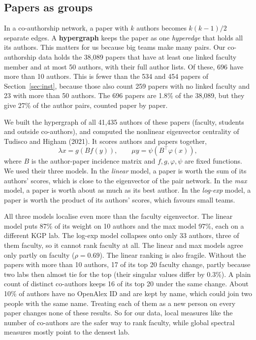 \documentclass[conference,10pt]{IEEEtran}
\begin{document}
\subsection{Papers as groups}
In a co-authorship network, a paper with $k$ authors becomes $k(k-1)/2$ separate edges. A \textbf{hypergraph} keeps the
paper as one \textit{hyperedge} that holds all its authors. This matters for us because big teams make many pairs.
Our co-authorship data holds the 38,089 papers that have at least one linked faculty member and at most 50 authors,
with their full author lists. Of these, 696 have more than 10 authors. This is fewer than the 534 and 454 papers of
Section~\ref{sec:inst}, because those also count 259 papers with no linked faculty and 23 with more than 50 authors.
The 696 papers are 1.8\% of the 38,089, but they give 27\% of the author pairs, counted paper by paper.

We built the hypergraph of all 41,435 authors of these papers (faculty, students and outside co-authors), and computed the nonlinear
eigenvector centrality of Tudisco and Higham (2021). It scores authors and papers together,
\[
\lambda x = g\!\left(B f(y)\right), \qquad \mu y = \psi\!\left(B^{\top} \varphi(x)\right),
\]
where $B$ is the author-paper incidence matrix and $f, g, \varphi, \psi$ are fixed functions. We used their three
models. In the \textit{linear} model, a paper is worth the sum of its authors' scores, which is close to the eigenvector
of the pair network. In the \textit{max} model, a paper is worth about as much as its best author. In the
\textit{log-exp} model, a paper is worth the product of its authors' scores, which favours small teams.

All three models localise even more than the faculty eigenvector. The linear model puts 87\% of its weight on 10
authors and the max model 97\%, each on a different KGP lab. The log-exp model collapses onto only 33 authors, three of
them faculty, so it cannot rank faculty at all. The linear and max models agree only partly on faculty ($\rho = 0.69$).
The linear ranking is also fragile. Without the papers with more than 10 authors, 17 of its top 20 faculty change,
partly because two labs then almost tie for the top (their singular values differ by 0.3\%). A plain count of distinct
co-authors keeps 16 of its top 20 under the same change. About 10\% of authors have no OpenAlex ID and are kept by
name, which could join two people with the same name. Treating each of them as a new person on every paper changes
none of these results. So for our data, local measures like the number of co-authors are the safer way to rank faculty,
while global spectral measures mostly point to the densest lab.
\end{document}
